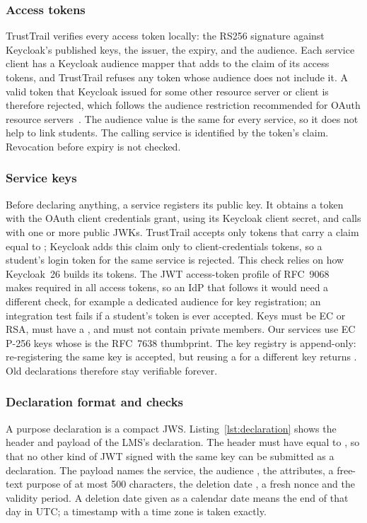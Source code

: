 \subsubsection{Access tokens}
TrustTrail verifies every access token locally: the RS256 signature against Keycloak's published keys, the issuer, the expiry, and the audience. Each service client has a Keycloak audience mapper that adds  to the  claim of its access tokens, and TrustTrail refuses any token whose audience does not include it. A valid token that Keycloak issued for some other resource server or client is therefore rejected, which follows the audience restriction recommended for OAuth resource servers~\cite{rfc8707,rfc9068}. The audience value is the same for every service, so it does not help to link students. The calling service is identified by the token's  claim. Revocation before expiry is not checked.

\subsubsection{Service keys}
Before declaring anything, a service registers its public key. It obtains a token with the OAuth client credentials grant, using its Keycloak client secret, and calls  with one or more public JWKs. TrustTrail accepts only tokens that carry a  claim equal to ; Keycloak adds this claim only to client-credentials tokens, so a student's login token for the same service is rejected. This check relies on how Keycloak~26 builds its tokens. The JWT access-token profile of RFC~9068~\cite{rfc9068} makes  required in all access tokens, so an IdP that follows it would need a different check, for example a dedicated audience for key registration; an integration test fails if a student's token is ever accepted. Keys must be EC or RSA, must have a , and must not contain private members. Our services use EC P-256 keys whose  is the RFC~7638 thumbprint. The key registry is append-only: re-registering the same key is accepted, but reusing a  for a different key returns . Old declarations therefore stay verifiable forever.

\subsubsection{Declaration format and checks}
A purpose declaration is a compact JWS. Listing~\ref{lst:declaration} shows the header and payload of the LMS's declaration. The header must have  equal to , so that no other kind of JWT signed with the same key can be submitted as a declaration. The payload names the service, the audience , the attributes, a free-text purpose of at most 500 characters, the deletion date , a fresh nonce and the validity period. A deletion date given as a calendar date means the end of that day in UTC; a timestamp with a time zone is taken exactly.

